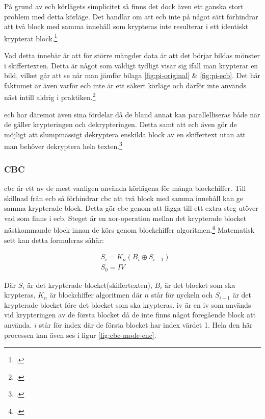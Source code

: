 På grund av \acrshort{ecb} körlägets simplicitet så finns det dock även ett ganska
stort problem med detta körläge. Det handlar om att \acrshort{ecb} inte på något
sätt förhindrar att två block med samma innehåll som krypteras inte resulterar i
ett identiskt krypterat block.\footcite{dworkin2001sp}

Vad detta innebär är att för större mängder data
är att det börjar bildas mönster i skiffertexten. Detta är något som väldigt
tydligt visar sig ifall man krypterar en bild, vilket går att se när man jämför
bilaga \ref{fig:pi-original} \& \ref{fig:pi-ecb}.
Det här faktumet är även varför \acrshort{ecb} inte är ett säkert körläge
och därför inte används näst intill aldrig i praktiken.\footcite{dworkin2001sp}

\acrshort{ecb} har däremot även sina fördelar då de bland annat kan parallelliseras
både när de gäller krypteringen och dekrypteringen. Detta samt att \acrshort{ecb}
även gör de möjligt att slumpmässigt dekryptera enskilda block av en skiffertext
utan att man behöver dekryptera hela texten.\footcite{dworkin2001sp}

\subsubsection{CBC}
\label{sec:cbc}
\acrlong{cbc} är ett av de mest vanligen använda körlägena för många blockchiffer.
Till skillnad från \acrshort{ecb} så förhindrar \acrshort{cbc} att två block med
samma innehåll kan ge samma krypterade block. Detta gör \acrshort{cbc} genom att
lägga till ett extra steg utöver vad som finns i \acrshort{ecb}. Steget
är en \gls{xor}-operation mellan det krypterade blocket nästkommande block innan
de körs genom blockchiffer algoritmen.\footcite{dworkin2001sp}
Matematisk sett kan detta formuleras såhär:

\begin{equation}
    \label{eq:cbc-encryption}
    \begin{aligned}
        &S_i = K_n(B_i \oplus S_{i-1})\\\nonumber
        &S_0 = IV
    \end{aligned}
\end{equation}

Där $S_i$ är det krypterade blocket(skiffertexten), $B_i$ är det blocket som ska krypteras,
$K_n$ är blockchiffer algoritmen där $n$ står för nyckeln och $S_{i-1}$ är
det krypterade blocket före det blocket som ska krypteras. \acrshort{iv} är en
\acrfull{iv} som används vid krypteringen av de första blocket då de inte finns
något föregående block att använda. $i$ står för index där de första blocket har
index värdet 1. Hela den här processen kan även ses i figur \ref{fig:cbc-mode-enc}.


